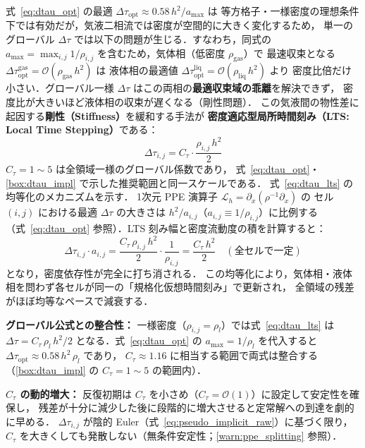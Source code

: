 式~\eqref{eq:dtau_opt} の最適 $\Delta\tau_\mathrm{opt} \approx 0.58\,h^2/a_\mathrm{max}$ は
等方格子・一様密度の理想条件下では有効だが，気液二相流では密度が空間的に大きく変化するため，
単一のグローバル $\Delta\tau$ では以下の問題が生じる．すなわち，同式の
$a_\mathrm{max} = \max_{i,j} 1/\rho_{i,j}$ を含むため，気体相（低密度 $\rho_\mathrm{gas}$）で
最速収束となる $\Delta\tau_\mathrm{opt}^\mathrm{gas} = \mathcal{O}(\rho_\mathrm{gas}\,h^2)$ は
液体相の最適値 $\Delta\tau_\mathrm{opt}^\mathrm{liq} = \mathcal{O}(\rho_\mathrm{liq}\,h^2)$ より
密度比倍だけ小さい．グローバル一様 $\Delta\tau$ はこの両相の\textbf{最適収束域の乖離}を解決できず，
密度比が大きいほど液体相の収束が遅くなる（剛性問題）．
この気液間の物性差に起因する\textbf{剛性（Stiffness）}を緩和する手法が
\textbf{密度適応型局所時間刻み（LTS: Local Time Stepping）}である：
\begin{equation}
  \Delta\tau_{i,j} = C_\tau \cdot \frac{\rho_{i,j}\,h^2}{2}
  \label{eq:dtau_lts}
\end{equation}
$C_\tau = 1 \sim 5$ は全領域一様のグローバル係数であり，
式~\eqref{eq:dtau_opt}・\ref{box:dtau_impl} で示した推奨範囲と同一スケールである．
式~\eqref{eq:dtau_lts} の均等化のメカニズムを示す．
1次元 PPE 演算子 $\mathcal{L}_h = \partial_x(\rho^{-1}\partial_x)$ の
セル $(i,j)$ における最適 $\Delta\tau$ の大きさは $h^2/a_{i,j}$（$a_{i,j} \equiv 1/\rho_{i,j}$）に比例する
（式~\eqref{eq:dtau_opt} 参照）．LTS 刻み幅と密度流動度の積を計算すると：
\begin{equation*}
  \Delta\tau_{i,j} \cdot a_{i,j}
  = \frac{C_\tau\,\rho_{i,j}\,h^2}{2} \cdot \frac{1}{\rho_{i,j}}
  = \frac{C_\tau\,h^2}{2} \quad (\text{全セルで一定})
\end{equation*}
となり，密度依存性が完全に打ち消される．
この均等化により，気体相・液体相を問わず各セルが同一の「規格化仮想時間刻み」で更新され，
全領域の残差がほぼ均等なペースで減衰する．

\textbf{グローバル公式との整合性：}
一様密度（$\rho_{i,j} = \rho_l$）では式~\eqref{eq:dtau_lts} は
$\Delta\tau = C_\tau\,\rho_l\,h^2/2$ となる．式~\eqref{eq:dtau_opt} の $a_\mathrm{max} = 1/\rho_l$ を代入すると
$\Delta\tau_\mathrm{opt} \approx 0.58\,h^2\,\rho_l$ であり，
$C_\tau \approx 1.16$ に相当する範囲で両式は整合する（\ref{box:dtau_impl} の $C_\tau = 1 \sim 5$ の範囲内）．

\textbf{$C_\tau$ の動的増大：}
反復初期は $C_\tau$ を小さめ（$C_\tau = \mathcal{O}(1)$）に設定して安定性を確保し，
残差が十分に減少した後に段階的に増大させると定常解への到達を劇的に早める．
$\Delta\tau_{i,j}$ が陰的 Euler（式~\eqref{eq:pseudo_implicit_raw}）に基づく限り，
$C_\tau$ を大きくしても発散しない（無条件安定性；\ref{warn:ppe_splitting} 参照）．

